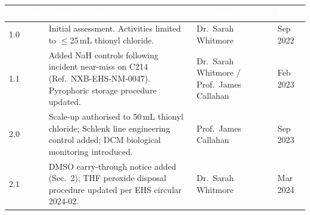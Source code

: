 
\newpage


\vspace{4pt}

\noindent
\begin{tabularx}{\linewidth}{@{}
  >{\small\centering}p{1.4cm}
  >{\small}X
  >{\small}p{3.5cm}
  >{\small\centering\arraybackslash}p{2.4cm}
  @{}}
\toprule
\rowcolor{NavyDeep}
\textcolor{white}{\textbf{Version}} &
\textcolor{white}{\textbf{Changes Made}} &
\textcolor{white}{\textbf{Reviewed By}} &
\textcolor{white}{\textbf{Date}} \\
\midrule
\rowcolor{LightFog}
1.0 & Initial assessment. Activities limited to $\leq$25\,mL thionyl chloride.
& Dr.\ Sarah Whitmore & 10 Sep 2022 \\
\rowcolor{white}
1.1 & Added NaH controls following incident near-miss on C214 (Ref.\ NXB-EHS-NM-0047). Pyrophoric storage procedure updated. & Dr.\ Sarah Whitmore / Prof.\ James Callahan & 03 Feb 2023 \\
\rowcolor{LightFog}
2.0 & Scale-up authorised to 50\,mL thionyl chloride; Schlenk line engineering control added; DCM biological monitoring introduced. & Prof.\ James Callahan & 01 Sep 2023 \\
\rowcolor{white}
2.1 & DMSO carry-through notice added (Sec.\ 2); THF peroxide disposal procedure updated per EHS circular 2024-02. & Dr.\ Sarah Whitmore & 14 Mar 2024 \\
\bottomrule
\end{tabularx}

\vspace{10pt}


\vspace{6pt}

